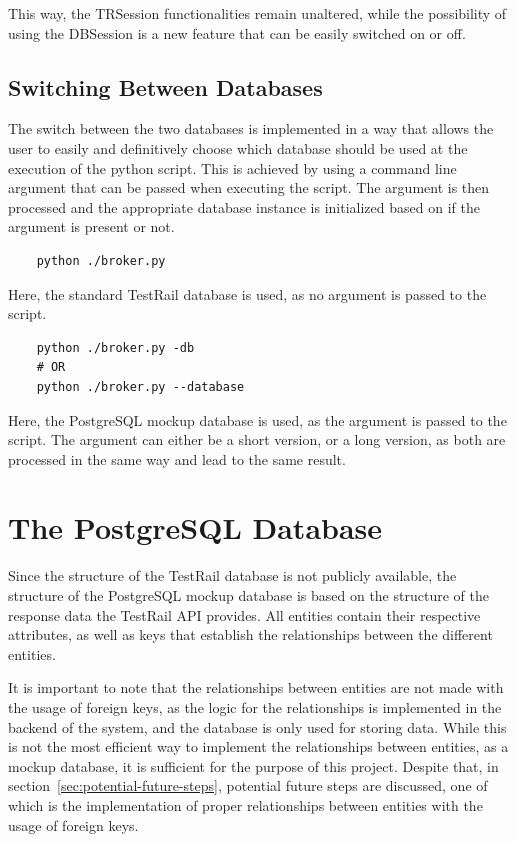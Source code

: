 This way, the TRSession functionalities remain unaltered, while the possibility of using the DBSession is a new feature that can be easily switched on or off.

\subsection{Switching Between Databases}

The switch between the two databases is implemented in a way that allows the user to easily and definitively choose which database should be used at the execution of the python script. This is achieved by using a command line argument that can be passed when executing the script. The argument is then processed and the appropriate database instance is initialized based on if the argument is present or not. 

\begin{verbatim}
    python ./broker.py
\end{verbatim}

Here, the standard TestRail database is used, as no argument is passed to the script.

\begin{verbatim}
    python ./broker.py -db
    # OR
    python ./broker.py --database
\end{verbatim}

Here, the PostgreSQL mockup database is used, as the argument is passed to the script. The argument can either be a short version, or a long version, as both are processed in the same way and lead to the same result.

\section{The PostgreSQL Database}

Since the structure of the TestRail database is not publicly available, the structure of the PostgreSQL mockup database is based on the structure of the response data the TestRail API provides. All entities contain their respective attributes, as well as keys that establish the relationships between the different entities.

It is important to note that the relationships between entities are not made with the usage of foreign keys, as the logic for the relationships is implemented in the backend of the system, and the database is only used for storing data. While this is not the most efficient way to implement the relationships between entities, as a mockup database, it is sufficient for the purpose of this project. Despite that, in section~\ref{sec:potential-future-steps}, potential future steps are discussed, one of which is the implementation of proper relationships between entities with the usage of foreign keys.

